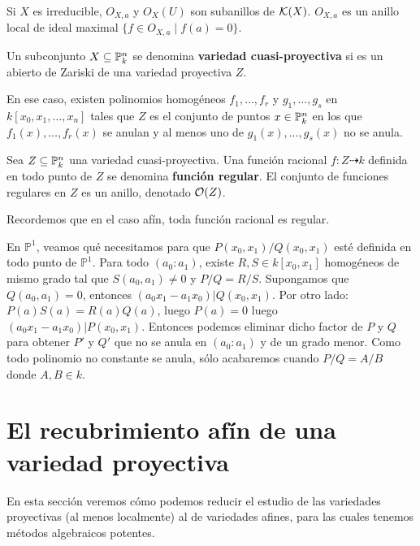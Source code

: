 \documentclass[ACGA.tex]{subfiles}
\begin{document}
\begin{prop}
Si $X$ es irreducible, $O_{X,a}$ y $O_X(U)$ son subanillos de ${\mathcal K}(X)$. $O_{X,a}$ es un anillo local de ideal maximal $\{f \in O_{X,a} \mid f(a)=0\}$.
\end{prop}

\begin{defi}
 Un subconjunto $X\subseteq\mathbb{P}^n_k$ se denomina {\bf variedad cuasi-proyectiva} si es un abierto de Zariski de una variedad proyectiva $Z$.
\end{defi}

En ese caso, existen polinomios homogéneos $f_1,\ldots,f_r$ y $g_1,\ldots,g_s$ en $k[x_0,x_1,\ldots,x_n]$ tales que $Z$ es el conjunto de puntos $x\in\mathbb{P}^n_k$ en los que $f_1(x),\ldots,f_r(x)$ se anulan y al menos uno de $g_1(x),\ldots,g_s(x)$ no se anula. 

\begin{defi}
 Sea $Z\subseteq\mathbb{P}^n_k$ una variedad cuasi-proyectiva. Una función racional $f:Z\dashrightarrow k$ definida en todo punto de $Z$ se denomina {\bf función regular}. El conjunto de funciones regulares en $Z$ es un anillo, denotado ${\mathcal O}(Z)$.
\end{defi}

\begin{nota}
Recordemos que en el caso afín, toda función racional es regular.
\end{nota}

\begin{ej}
En $\mathbb{P}^1$, veamos qué necesitamos para que $P(x_0,x_1)/Q(x_0,x_1)$ esté definida en todo punto de $\mathbb{P}^1$. Para todo $(a_0:a_1)$, existe $R,S \in k[x_0,x_1]$ homogéneos de mismo grado tal que $S(a_0,a_1)\neq 0$ y $P/Q=R/S$. Supongamos que $Q(a_0,a_1)=0$, entonces $(a_0x_1-a_1x_0) | Q(x_0,x_1)$. Por otro lado: $P(a)S(a)=R(a)Q(a)$, luego $P(a)=0$ luego $(a_0x_1-a_1x_0) | P(x_0,x_1)$. Entonces podemos eliminar dicho factor de $P$ y $Q$ para obtener $P'$ y $Q'$ que no se anula en $(a_0:a_1)$ y de un grado menor. Como todo polinomio no constante se anula, sólo acabaremos cuando $P/Q=A/B$ donde $A,B \in k$. 
\end{ej}

\section{El recubrimiento afín de una variedad proyectiva}\label{recubrimientoafin}

En esta sección veremos cómo podemos reducir el estudio de las variedades proyectivas (al menos localmente) al de variedades afines, para las cuales tenemos métodos algebraicos potentes.
\end{document}
